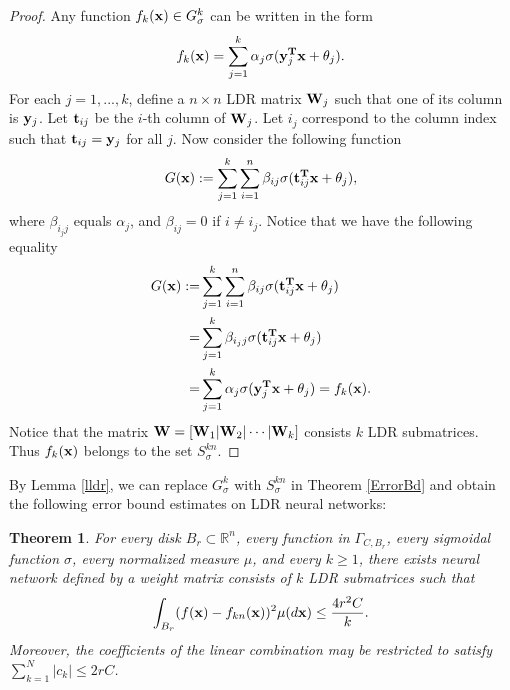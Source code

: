 \documentclass{article}
\newtheorem{theorem}{Theorem}[section]
\begin{document}
\begin{proof}
Any function $f_k({\bf x})\in G^{k}_\sigma$ can be written in the form
\begin{equation}
f_k({\bf x}) = \sum_{j=1}^k \alpha_j {\sigma}({\bf y}_j^{\bf T}{\bf x} + \theta_j).
\end{equation}
For each $j=1,...,k$, define a $n\times n$ LDR matrix ${\bf W}_j$ such that one of its column is ${\bf y}_j$. Let ${\bf t}_{ij}$ be the $i$-th column of ${\bf W}_j$. Let $i_j$ correspond to the column index such that ${\bf t}_{ij} = {\bf y}_j$ for all $j$. Now consider the following function
\begin{equation}
G({\bf x}) := \sum_{j=1}^k\sum_{i=1}^n \beta_{ij}\sigma({\bf t}_{ij}^{\bf T}{\bf x}+\theta_j),
\end{equation}
where $\beta_{i_jj}$ equals $\alpha_j$, and $\beta_{ij}=0$ if $i\neq i_j$. Notice that we have the following equality
\begin{align*}
G({\bf x}) :=& \sum_{j=1}^k\sum_{i=1}^n \beta_{ij}\sigma({\bf t}_{ij}^{\bf T}{\bf x}+\theta_j)\\
=& \sum_{j=1}^k \beta_{i_jj}\sigma({\bf t}_{ij}^{\bf T}{\bf x}+\theta_j)\\
=& \sum_{j=1}^k \alpha_j\sigma({\bf y}_{j}^{\bf T}{\bf x}+\theta_j)
= f_k({\bf x}).
\end{align*}
Notice that the matrix ${\bf W} = [{\bf W}_1|{\bf W}_2|\cdots|{\bf W}_k]$ consists $k$ LDR submatrices. Thus $f_k({\bf x})$ belongs to the set $S^{kn}_\sigma$.
\end{proof}

By Lemma \ref{lldr}, we can replace $G^{k}_\sigma$ with $S^{kn}_\sigma$ in Theorem \ref{ErrorBd} and obtain the following error bound estimates on LDR neural networks:

\begin{theorem}
\label{ErrorBdT}
For every disk $B_r\subset\mathbb{R}^n$, every function in $\Gamma_{C, B_r}$, every sigmoidal function $\sigma$, every normalized measure $\mu$, and every $k\ge 1$, there exists neural network defined by a weight matrix consists of $k$ LDR submatrices
such that
\begin{equation}
\int_{B_r}(f({\bf x})-f_{kn}({\bf x}))^2\mu(d{\bf x})\le \frac{4r^2C}{k}.
\end{equation}
Moreover, the coefficients of the linear combination may be restricted to satisfy $\sum_{k=1}^N|c_k|\le 2rC$.
\end{theorem}
\end{document}
